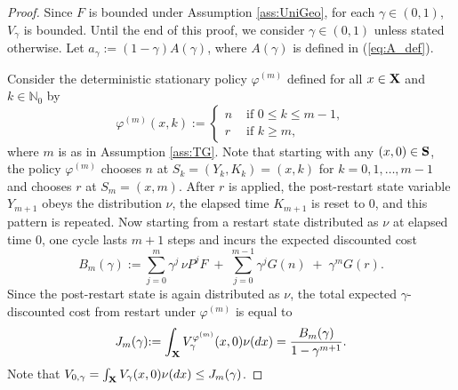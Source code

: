 \documentclass[10pt,a4paper]{amsart}
\begin{document}
\begin{proof}
Since $F$ is bounded under Assumption \ref{ass:UniGeo}, for each $\gamma\in(0,1)$, $V_\gamma$ is bounded. Until the end of this proof, we consider $\gamma\in(0,1)$ unless stated otherwise.
Let $a_\gamma:=(1-\gamma){A(\gamma)}$, where ${A(\gamma)}$ is defined in (\ref{eq:A_def}).

Consider the {deterministic} stationary policy ${\varphi}^{(m)}$ {defined for all $x\in {\bf X}$ and $k\in\mathbb{N}_0$ by $$\varphi^{(m)}(x,k):=\begin{cases}
n &\mbox{ if $0\le k\le m-1$},\\
r &\mbox{ if $k\ge m$,}
\end{cases}$$
where $m$ is as in Assumption \ref{ass:TG}.}
{Note that starting with any $(x,0)\in {\bf S}$, the policy $\varphi^{(m)}$} chooses $n$ at {$S_k=(Y_k,K_k)=(x,k)$} for $k=0,1,\dots,m-1$
and chooses $r$ at {$S_m=(x,m)$.  After $r$ is applied, the post-restart state variable $Y_{m+1}$ obeys the distribution $\nu$, the elapsed time $K_{m+1}$ is reset to $0$, and this pattern is repeated.} 
Now starting from a restart state distributed as $\nu$ at elapsed time $0$, 
one cycle lasts $m+1$ steps and incurs the expected discounted cost
\[
B_m(\gamma):=\sum_{j=0}^{m}\gamma^j\,\nu P^jF\;+\;\sum_{j=0}^{m-1}\gamma^j G(n)\;+\;\gamma^m G(r).
\]
Since the post-restart state is again distributed as $\nu$, the total expected {$\gamma$-discounted} cost from restart 
under ${\varphi}^{(m)}$ is equal to
\begin{equation}\label{eq:Jm_def}
J_m(\gamma){:= \int_{\bf X}  V_\gamma^{\varphi^{(m)}}(x,0)\nu(dx)} =\frac{B_m(\gamma)}{1-\gamma^{m+1}}.
\end{equation}
 {Note that  $V_{0,\gamma}=\int_{\bf X}  V_\gamma (x,0)\nu(dx) \le J_m(\gamma)$.}


\end{proof}
\end{document}
